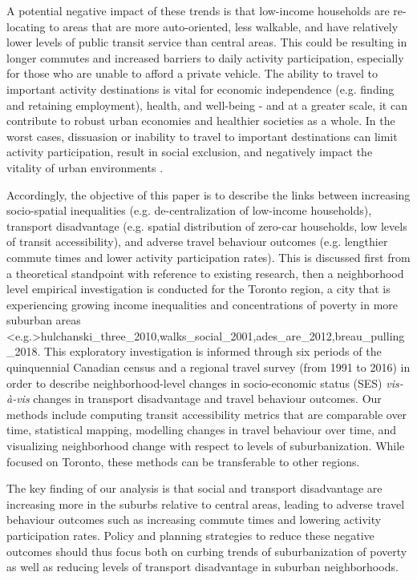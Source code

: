A potential negative impact of these trends is that low-income households are re-locating to areas that are more auto-oriented, less walkable, and have relatively lower levels of public transit service than central areas. This could be resulting in longer commutes and increased barriers to daily activity participation, especially for those who are unable to afford a private vehicle. The ability to travel to important activity destinations is vital for economic independence (e.g. finding and retaining employment), health, and well-being - and at a greater scale, it can contribute to robust urban economies and healthier societies as a whole. In the worst cases, dissuasion or inability to travel to important destinations can limit activity participation, result in social exclusion, and negatively impact the vitality of urban environments \cite{lucas_transport_2012,martens_transport_2016}.

Accordingly, the objective of this paper is to describe the links between increasing socio-spatial inequalities (e.g. de-centralization of low-income households), transport disadvantage (e.g. spatial distribution of zero-car households, low levels of transit accessibility), and adverse travel behaviour outcomes (e.g. lengthier commute times and lower activity participation rates). This is discussed first from a theoretical standpoint with reference to existing research, then a neighborhood level empirical investigation is conducted for the Toronto region, a city that is experiencing growing income inequalities and concentrations of poverty in more suburban areas \shortcite<e.g.>{hulchanski_three_2010,walks_social_2001,ades_are_2012,breau_pulling_2018}.
This exploratory investigation is informed through six periods of the quinquennial Canadian census and a regional travel survey (from 1991 to 2016) in order to describe neighborhood-level changes in socio-economic status (SES) \textit{vis-\`a-vis} changes in transport disadvantage and travel behaviour outcomes. Our methods include computing transit accessibility metrics that are comparable over time, statistical mapping, modelling changes in travel behaviour over time, and visualizing neighborhood change with respect to levels of suburbanization. While focused on Toronto, these methods can be transferable to other regions.

The key finding of our analysis is that social and transport disadvantage are increasing more in the suburbs relative to central areas, leading to adverse travel behaviour outcomes such as increasing commute times and lowering activity participation rates. Policy and planning strategies to reduce these negative outcomes should thus focus both on curbing trends of suburbanization of poverty as well as reducing levels of transport disadvantage in suburban neighborhoods. 





